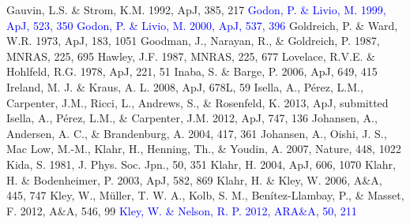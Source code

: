 \documentclass[apj]{emulateapj}
\def\blue#1{\textcolor{blue}{ #1}}
\begin{document}
\begin{thebibliography}{}
 Gauvin, L.S. \& Strom, K.M. 1992, ApJ, 385, 217
 \blue{Godon, P. \& Livio, M. 1999, ApJ, 523, 350}
 \blue{Godon, P. \& Livio, M. 2000, ApJ, 537, 396}
 Goldreich, P. \& Ward, W.R. 1973, ApJ, 183, 1051
 Goodman, J., Narayan, R., \& Goldreich, P. 1987, MNRAS, 225, 695
 Hawley, J.F. 1987, MNRAS, 225, 677
  Lovelace, R.V.E. \& Hohlfeld, R.G. 1978, ApJ, 221, 51
 Inaba, S. \& Barge, P. 2006, ApJ, 649, 415
 Ireland, M. J. \& Kraus, A. L. 2008, ApJ, 678L, 59
 Isella, A., P\'erez, L.M., Carpenter, J.M., Ricci, L., Andrews, S., \& Rosenfeld, K. 2013, ApJ, submitted
 Isella, A., P\'erez, L.M., \& Carpenter, J.M. 2012, ApJ, 747, 136
 Johansen, A., Andersen, A. C., \& Brandenburg, A. 2004, 417, 361
 Johansen, A., Oishi, J. S., Mac Low, M.-M., Klahr, H., Henning, Th., \& Youdin, A. 2007, Nature, 448, 1022
 Kida, S. 1981, J. Phys. Soc. Jpn.,  50, 351
 Klahr, H. 2004, ApJ, 606, 1070
 Klahr, H. \& Bodenheimer, P. 2003, ApJ, 582, 869
 Klahr, H. \& Kley, W. 2006, A\&A, 445, 747
 Kley, W., M\"uller, T. W. A., Kolb, S. M., Ben\'itez-Llambay, P., \& Masset, F. 2012, A\&A, 546, 99
\blue{\bibitem[{{\blue{Kley \& Nelson}}(2012)}]{Kley-Nelson12} Kley, W. \& Nelson, R. P. 2012, ARA\&A, 50, 211} 

\end{thebibliography}
\end{document}
